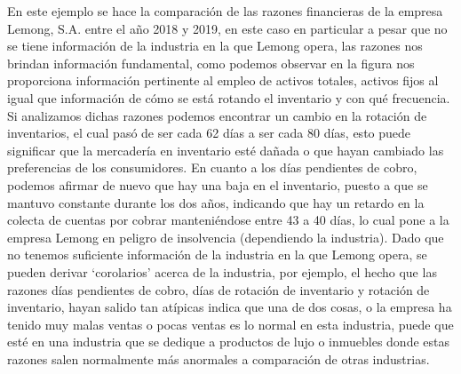 \documentclass{article}
\begin{document}
En este ejemplo se hace la comparación de las razones financieras de la empresa Lemong, S.A. entre el año 2018 y 2019, en este caso en particular a pesar que no se tiene información de la industria en la que Lemong opera, las razones nos brindan información fundamental, como podemos observar en la figura nos proporciona información pertinente al empleo de activos totales, activos fijos al igual que información de cómo se está rotando el inventario y con qué frecuencia. Si analizamos dichas razones podemos encontrar un cambio en la rotación de inventarios, el cual pasó de ser cada 62 días a ser cada 80 días, esto puede significar que la mercadería en inventario esté dañada o que hayan cambiado las preferencias de los consumidores. En cuanto a los días pendientes de cobro, podemos afirmar de nuevo que hay una baja en el inventario, puesto a que se mantuvo constante durante los dos años, indicando que hay un retardo en la colecta de cuentas por cobrar manteniéndose entre 43 a 40 días, lo cual pone a la empresa Lemong en peligro de insolvencia (dependiendo la industria). Dado que no tenemos suficiente información de la industria en la que Lemong opera, se pueden derivar ‘corolarios’ acerca de la industria, por ejemplo, el hecho que las razones días pendientes de cobro, días de rotación de inventario y rotación de inventario, hayan salido tan atípicas indica que una de dos cosas, o la empresa ha tenido muy malas ventas o pocas ventas es lo normal en esta industria, puede que esté en una industria que se dedique a productos de lujo o inmuebles donde estas razones salen normalmente más anormales a comparación de otras industrias.

\newpage
\end{document}
